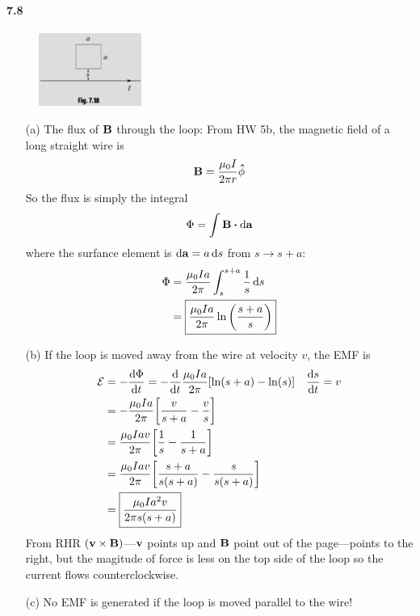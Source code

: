 \documentclass[../main.tex]{subfiles}
\begin{document}
\newpage
\paragraph{7.8} 
\begin{figure}[ht]
    \centering
    \includegraphics[width=0.3\textwidth]{hw11_5.png}
\end{figure}
\begin{itemize}
    \item [(a)] The flux of $\vb B$ through the loop: From HW 5b, the magnetic field of a long 
    straight wire is 
    \begin{align*}
        \vb B = \frac{\mu_0 I}{2\pi r} \vu \phi
    \end{align*}
    So the flux is simply the integral
    \begin{align*}
        \Phi = \int \vb B \vdot \dd{\vb a}
    \end{align*}
    where the surfance element is $\dd{\vb a} = a \dd{s}$ from $s \to s + a$:
    \begin{align*}
        \Phi &= \frac{\mu_0 Ia }{2\pi} \int_s^{s+a} \frac{1}{s} \dd{s} \\
        &= \boxed{\frac{\mu_0 Ia}{2\pi} \ln\qt(\frac{s+a}{s})}
    \end{align*}
    \item [(b)] If the loop is moved away from the wire at velocity $v$, the EMF is
    \begin{align*}
        \mathcal{E} &= -\dv{\Phi}{t} = -\dv{t} \frac{\mu_0 Ia}{2\pi} [\ln(s + a) - \ln(s)] \quad \dv{s}{t} = v \\
        &= -\frac{\mu_0 Ia}{2\pi} \qt[
            \frac{v}{s + a} - \frac{v}{s}
        ] \\
        &= \frac{\mu_0 Ia v}{2\pi} \qt[
            \frac{1}{s} - \frac{1}{s + a}
        ] \\
        &= \frac{\mu_0 Ia v}{2\pi} \qt[
            \frac{s+a}{s(s+a)} - \frac{s}{s(s+a)}
        ] \\
        &= \boxed{
            \frac{\mu_0 Ia^2 v}{2\pi s(s+a)}
        }
    \end{align*}
    From RHR $(\vb v \times \vb B)$---$\vb v$ points up and $\vb B$ point out of the page---points to the right,
    but the magitude of force is less on the top side of the loop so the current flows
    counterclockwise.
    \item [(c)] No EMF is generated if the loop is moved parallel to the wire!
\end{itemize}
\end{document}

